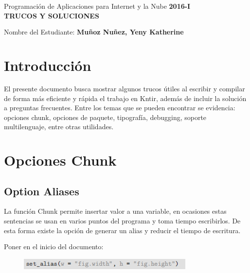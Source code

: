 \documentclass[10pt]{article}   			%
\begin{document}
	\renewcommand{\headrulewidth}{0.5pt}

	\thispagestyle{empty}						%
	\begin{center}
		\large {Programación de Aplicaciones para Internet y la Nube
			\hspace{5 cm}\textbf{2016-I}}
		\bigskip  
		\textbf{
			\LARGE{\\TRUCOS Y SOLUCIONES}}\\								%
	\end{center}	
	\begin{flushright}	
		\bigskip	
		Nombre del Estudiante: \textbf{Muñoz Nuñez, Yeny Katherine}			%
	\end{flushright} 
	
\section{Introducción}

El presente documento busca mostrar algunos trucos útiles al escribir y compilar de forma más eficiente y rápida el trabajo en Kntir, además de incluir la solución a preguntas frecuentes. Entre los temas que se pueden encontrar se evidencia: opciones chunk, opciones de paquete, tipografía, debugging, soporte multilenguaje, entre otras utilidades.
		
\section{Opciones Chunk}

\subsection{Option Aliases}

La función Chunk permite insertar valor a una variable, en ocasiones estas sentencias se usan en varios puntos del programa y toma tiempo escribirlos. De esta forma existe la opción de generar un alias y reducir el tiempo de escritura.

Poner en el inicio del documento:
		
\begin{figure}[ht] 
	\centering
		\includegraphics[scale=1.5]{Aliases1}
		\label{fig:Aliases1}
\end{figure}
\end{document}
